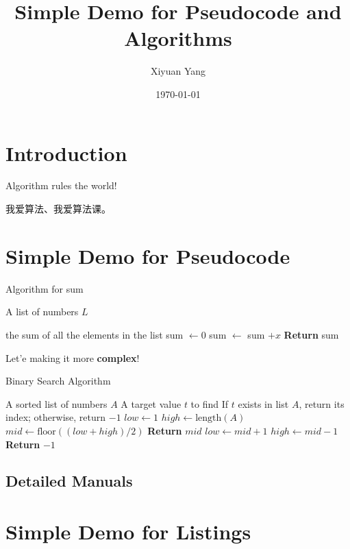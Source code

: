 \documentclass{article}
\title{Simple Demo for Pseudocode and Algorithms}
\author{Xiyuan Yang}
\date{\today}
\begin{document}
\maketitle
\section{Introduction}

Algorithm rules the world!

我爱算法、我爱算法课。

\section{Simple Demo for Pseudocode}

\begin{algorithm}[H]
    \caption{Algorithm for sum}
    \label{alg:sum_algorithm}
    \begin{algorithmic}[1]
        \Require A list of numbers $L$

        \Ensure the sum of all the elements in the list
        \State sum $\gets 0$
            \State sum $\gets$ sum $+ x$
        \EndFor
        \State \textbf{Return} sum
    \end{algorithmic}
\end{algorithm}

Let'e making it more \textbf{complex}!

\begin{algorithm}[H]
    \caption{Binary Search Algorithm}
    \label{alg:binary_search}
    \begin{algorithmic}[1]
        \Require A sorted list of numbers $A$
        \Require A target value $t$ to find
        \Ensure If $t$ exists in list $A$, return its index; otherwise, return $-1$
        \State $low \gets 1$
        \State $high \gets \text{length}(A)$
            \State $mid \gets \text{floor}((low + high) / 2)$
                \State \textbf{Return} $mid$
                \State $low \gets mid + 1$
            \Else
                \State $high \gets mid - 1$
            \EndIf
        \EndWhile
        \State \textbf{Return} $-1$
    \end{algorithmic}
\end{algorithm}


\subsection{Detailed Manuals}

\section{Simple Demo for Listings}
\end{document}
